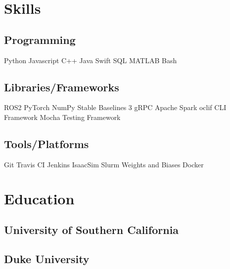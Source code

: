 \documentclass[]{plushcv}
\begin{document}
\hfill
\begin{minipage}[t]{0.25\textwidth} 


\section{Skills}
\subsection{Programming}
\sectionsep
Python \textbullet{} Javascript \textbullet{} C++ \textbullet{} Java \textbullet{} Swift \textbullet{} SQL \textbullet{} MATLAB \textbullet{} Bash

\sectionsep
\sectionsep

\subsection{Libraries/Frameworks}
\sectionsep
ROS2 \textbullet{} PyTorch \textbullet{} NumPy \textbullet{} Stable Baselines 3 \textbullet{} gRPC \textbullet{} Apache Spark \textbullet{} oclif CLI Framework \textbullet{} Mocha Testing Framework 

\sectionsep
\sectionsep

\subsection{Tools/Platforms}
\sectionsep
Git \textbullet{} Travis CI \textbullet{} Jenkins \textbullet{}  IsaacSim \textbullet{} Slurm \textbullet{} Weights and Biases \textbullet{} Docker 


\section{Education} 
\subsection{University of Southern California}

\sectionsep
\sectionsep

\subsection{Duke University}


\end{minipage}
\end{document}
